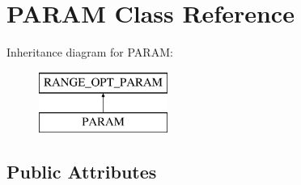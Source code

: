 \hypertarget{classPARAM}{}\section{P\+A\+R\+AM Class Reference}
\label{classPARAM}
Inheritance diagram for P\+A\+R\+AM\+:\begin{figure}[H]
\begin{center}
\leavevmode
\includegraphics[height=2.000000cm]{classPARAM}
\end{center}
\end{figure}
\subsection*{Public Attributes}
